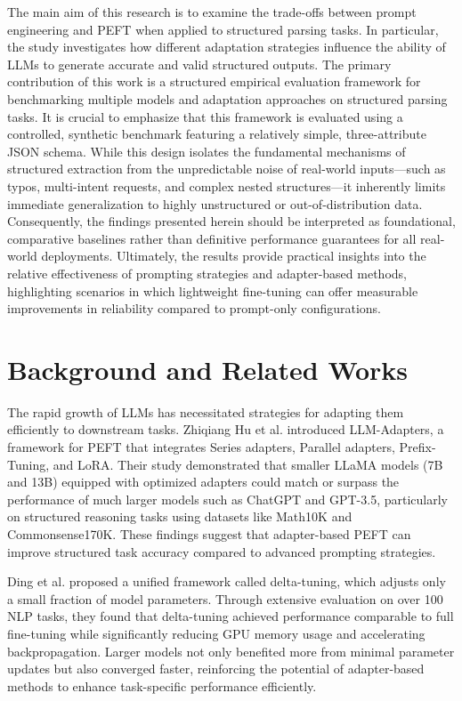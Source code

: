 \documentclass[journal,article,submit,pdftex,moreauthors]{Definitions/mdpi}
\begin{document}
The main aim of this research is to examine the trade-offs between prompt engineering and PEFT when applied to structured parsing tasks. In particular, the study investigates how different adaptation strategies influence the ability of LLMs to generate accurate and valid structured outputs. The primary contribution of this work is a structured empirical evaluation framework for benchmarking multiple models and adaptation approaches on structured parsing tasks. It is crucial to emphasize that this framework is evaluated using a controlled, synthetic benchmark featuring a relatively simple, three-attribute JSON schema. While this design isolates the fundamental mechanisms of structured extraction from the unpredictable noise of real-world inputs—such as typos, multi-intent requests, and complex nested structures—it inherently limits immediate generalization to highly unstructured or out-of-distribution data. Consequently, the findings presented herein should be interpreted as foundational, comparative baselines rather than definitive performance guarantees for all real-world deployments. Ultimately, the results provide practical insights into the relative effectiveness of prompting strategies and adapter-based methods, highlighting scenarios in which lightweight fine-tuning can offer measurable improvements in reliability compared to prompt-only configurations.

\section{Background and Related Works}

The rapid growth of LLMs has necessitated strategies for adapting them efficiently to downstream tasks. Zhiqiang Hu et al. \citep{hu2023llm} introduced LLM-Adapters, a framework for PEFT that integrates Series adapters, Parallel adapters, Prefix-Tuning, and LoRA. Their study demonstrated that smaller LLaMA models (7B and 13B) equipped with optimized adapters could match or surpass the performance of much larger models such as ChatGPT and GPT-3.5, particularly on structured reasoning tasks using datasets like Math10K and Commonsense170K. These findings suggest that adapter-based PEFT can improve structured task accuracy compared to advanced prompting strategies.

Ding et al. \citep{ding2023parameter} proposed a unified framework called delta-tuning, which adjusts only a small fraction of model parameters. Through extensive evaluation on over 100 NLP tasks, they found that delta-tuning achieved performance comparable to full fine-tuning while significantly reducing GPU memory usage and accelerating backpropagation. Larger models not only benefited more from minimal parameter updates but also converged faster, reinforcing the potential of adapter-based methods to enhance task-specific performance efficiently.
\end{document}
